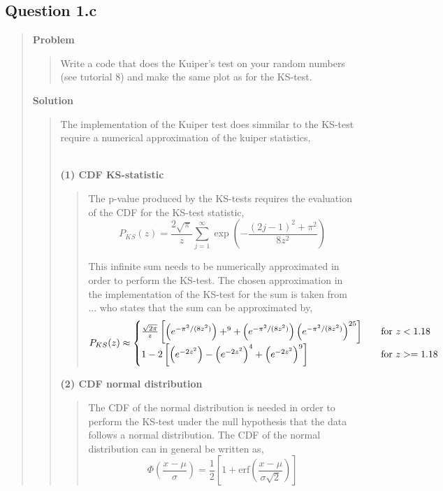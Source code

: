 
\subsection*{\textbf{Question 1.c}}
\begin{quote}

\textbf{Problem}
\begin{quote}
Write a code that does the Kuiper’s test on your random numbers (see tutorial
8) and make the same plot as for the KS-test.
\end{quote}

\textbf{Solution} 
\begin{quote}
The implementation of the Kuiper test does simmilar to the KS-test require a numerical approximation of the kuiper statistics,

\\

\textbf{(1) CDF KS-statistic }
\begin{quote}
The p-value produced by the KS-tests requires the evaluation of the CDF for the KS-test statistic,
\begin{equation}
P_{KS}(z) = \frac{2\sqrt{\pi}}{z} \sum_{j=1}^{\infty} \exp\left(- \frac{(2j-1)^2+\pi^2}{8z^2} \right)
\end{equation}

This infinite sum needs to be numerically approximated in order to perform the KS-test. The chosen approximation in the implementation of the KS-test for  the sum is taken from ... who states that the sum can be approximated by, %
\begin{equation}
P_{KS}(z) \approx
\begin{cases}
\frac{\sqrt{2 \pi}}{z} \left[ \left( e^{-\pi^2/(8z^2)} \right)+^{9} + \left( e^{-\pi^2/(8z^2)} \right) \left( e^{-\pi^2/(8z^2)} \right)^{25} \right] &\quad \text{for $ z < 1.18$}\\
1 -2 \left[ \left(e^{-2z^2}\right) - \left(e^{-2z^2}\right)^4 + \left(e^{-2z^2}\right)^9 \right]  &\quad \text{for $ z >= 1.18$}
\end{cases}
\end{equation}
\end{quote}

\textbf{(2) CDF normal distribution}
\begin{quote}
The CDF of the normal distribution is needed in order to perform the KS-test under the null hypothesis that the data follows a normal distribution. The CDF of the normal distribution can in general be written as,
\begin{equation}
\Phi\left( \frac{x- \mu}{\sigma}\right) = \frac{1}{2} \left[ 1 + \text{erf} \left( \frac{x - \mu}{\sigma\sqrt{2}} \right) \right]
\end{equation}


\end{quote}
\end{quote}
\end{quote}
